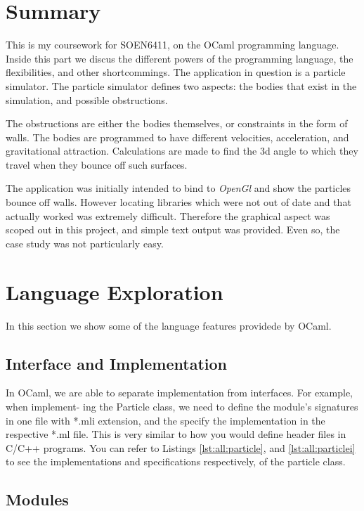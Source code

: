 \section{Summary}
This is my coursework for SOEN6411, on the OCaml programming language. Inside
this part we discus the different powers of the programming language, the
flexibilities, and other shortcommings.  The application in question is a
particle simulator. The particle simulator defines two aspects: the bodies that
exist in the simulation, and possible obstructions. 

The obstructions are either the bodies themselves, or constraints in the form
of walls. The bodies are programmed to have different velocities, acceleration,
and gravitational attraction. Calculations are made to find the 3d angle to
which they travel when they bounce off such surfaces.

The application was initially intended to bind to \textit{OpenGl} and show the
particles bounce off walls. However locating libraries which were not out of
date and that actually worked was extremely difficult. Therefore the graphical
aspect was scoped out in this project, and simple text output was provided.
Even so, the case study was not particularly easy.

\section{Language Exploration}
In this section we show some of the language features providede by OCaml.

\subsection{Interface and Implementation}

In OCaml, we are able to separate implementation from interfaces. For example,
when implement- ing the Particle class, we need to define the module’s
signatures in one file with *.mli extension, and the specify the implementation
in the respective *.ml file. This is very similar to how you would define
header files in C/C++ programs. You can refer to Listings
\ref{lst:all:particle}, and \ref{lst:all:particlei} to see the implementations
and specifications respectively, of the particle class.

\subsection{Modules}


